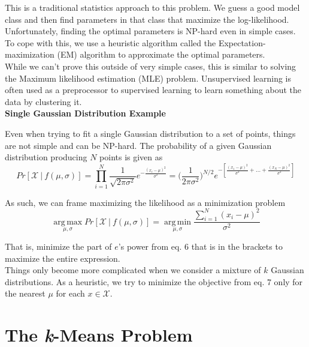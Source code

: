 \documentclass[english,course]{Notes}
\begin{document}
This is a traditional statistics approach to this problem. We guess a good model class and then find parameters in that class that maximize the log-likelihood. Unfortunately, finding the optimal parameters is NP-hard even in simple cases. To cope with this, we use a heuristic algorithm called the Expectation-maximization (EM) algorithm to approximate the optimal parameters. \\

While we can't prove this outside of very simple cases, this is similar to solving the Maximum likelihood estimation (MLE) problem. Unsupervised learning is often used as a preprocessor to supervised learning to learn something about the data by clustering it. \\

\textbf{Single Gaussian Distribution Example}

Even when trying to fit a single Gaussian distribution to a set of points, things are not simple and can be NP-hard. The probability of a given Gaussian distribution producing $N$ points is given as 
\begin{equation}
\label{eq:transition1}
Pr[\mathcal{X} \ \vert \ f(\mu, \sigma)] = \prod_{i = 1}^N \frac{1}{\sqrt{2 \pi \sigma^2}} e^{-\frac{(x_i - \mu)^2}{\sigma^2}} = \bigg(\frac{1}{2 \pi \sigma^2}\bigg)^{N/2} e^{-[\frac{(x_1 - \mu)^2}{\sigma^2} + ... + \frac{(x_N - \mu)^2}{\sigma^2}]}
\end{equation}

As such, we can frame maximizing the likelihood as a minimization problem
\begin{equation}
\label{eq:transition1}
\operatorname*{arg\,max}_{\mu, \sigma} Pr[\mathcal{X} \ \vert \ f(\mu, \sigma)] = \operatorname*{arg\,min}_{\mu, \sigma} \frac{\sum_{i = 1}^N (x_i - \mu)^2}{\sigma^2}
\end{equation}

That is, minimize the part of $e$'s power from eq. 6 that is in the brackets to maximize the entire expression. \\

Things only become more complicated when we consider a mixture of $k$ Gaussian distributions. As a heuristic, we try to minimize the objective from eq. 7 only for the nearest $\mu$ for each $x \in \mathcal{X}$.

\section{The \textit{k}-Means Problem}
\end{document}
